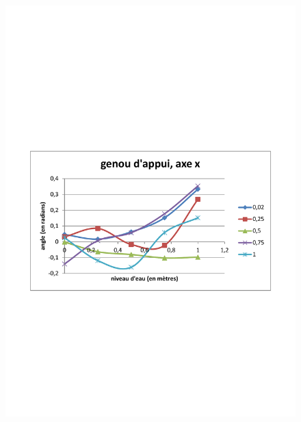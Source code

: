 \documentclass[runningheads,a4paper]{llncs}
\begin{document}
\begin{figure}[h]
\includegraphics[scale=0.3]{traj_pts_clefs/stance_knee_x.pdf}

\end{figure}
\end{document}
